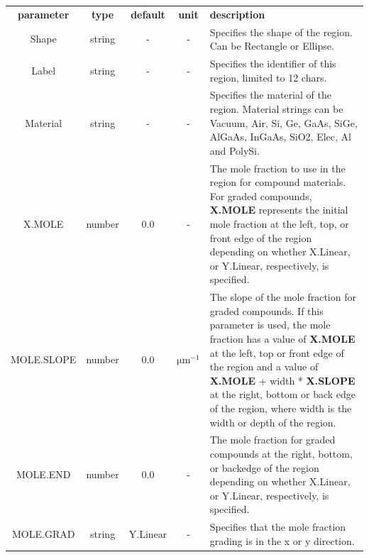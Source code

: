 \documentclass[11pt,pdftex]{article}
\begin{document}
\small
\noindent\begin{longtable}{ccccp{8.5cm}}
\textbf{parameter}   & \textbf{type}  & \textbf{default} & \textbf{unit} & \textbf{description} \\
Shape       & string  & -       & -                    & Specifies the shape of the region. Can be Rectangle or Ellipse.\\
Label       & string  & -       & -                    & Specifies the identifier of this region, limited to 12 chars. \\
Material    & string  & -       & -                    & Specifies the material of the region. Material strings can be
                                                         Vacuum, Air, Si, Ge, GaAs, SiGe, AlGaAs, InGaAs, SiO2, Elec, Al and PolySi.\\
X.MOLE      & number  & 0.0     & -                    & The mole fraction to use in the region for compound materials.
                                                         For graded compounds, \textbf{X.MOLE} represents the initial
                                                         mole fraction at the left, top, or front edge of the region
                                                         depending on whether X.Linear, or Y.Linear, respectively,
                                                         is specified. \\
MOLE.SLOPE & number   & 0.0     & $\mathrm{\mu m}^{-1}$ & The slope of the mole fraction for graded compounds. If this
                                                         parameter is used, the mole fraction has a value of \textbf{X.MOLE}
                                                         at the left, top or front edge of the region and a value of
                                                         \textbf{X.MOLE} + width * \textbf{X.SLOPE} at the right, bottom or back
                                                         edge of the region, where width is the width or depth of the
                                                         region. \\
MOLE.END   & number   & 0.0     & -                     & The mole fraction for graded compounds at the right, bottom,
                                                          or backedge of the region depending on whether X.Linear,
                                                          or Y.Linear, respectively, is specified. \\
MOLE.GRAD  & string   & Y.Linear & -                    & Specifies that the mole fraction grading is in the x or y direction. \\

\end{longtable}
\end{document}
